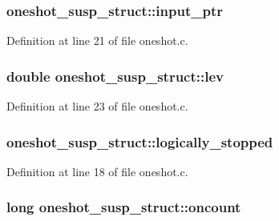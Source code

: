 \subsubsection[{\texorpdfstring{input\+\_\+ptr}{input_ptr}}]{ oneshot\+\_\+susp\+\_\+struct\+::input\+\_\+ptr}\hypertarget{structoneshot__susp__struct_ab0e3f30f5eb9c49d2cf8854f28d2f60c}{}\label{structoneshot__susp__struct_ab0e3f30f5eb9c49d2cf8854f28d2f60c}


Definition at line 21 of file oneshot.\+c.

\subsubsection[{\texorpdfstring{lev}{lev}}]{\setlength{\rightskip}{0pt plus 5cm}double oneshot\+\_\+susp\+\_\+struct\+::lev}\hypertarget{structoneshot__susp__struct_a8406c52a939abc677c66dfa729a24a33}{}\label{structoneshot__susp__struct_a8406c52a939abc677c66dfa729a24a33}


Definition at line 23 of file oneshot.\+c.

\subsubsection[{\texorpdfstring{logically\+\_\+stopped}{logically_stopped}}]{ oneshot\+\_\+susp\+\_\+struct\+::logically\+\_\+stopped}\hypertarget{structoneshot__susp__struct_ab33f92379d6d1aedf0971de10cd211cd}{}\label{structoneshot__susp__struct_ab33f92379d6d1aedf0971de10cd211cd}


Definition at line 18 of file oneshot.\+c.

\subsubsection[{\texorpdfstring{oncount}{oncount}}]{\setlength{\rightskip}{0pt plus 5cm}long oneshot\+\_\+susp\+\_\+struct\+::oncount}\hypertarget{structoneshot__susp__struct_a0aa3fec06068515500798883f43e95ec}{}\label{structoneshot__susp__struct_a0aa3fec06068515500798883f43e95ec}


